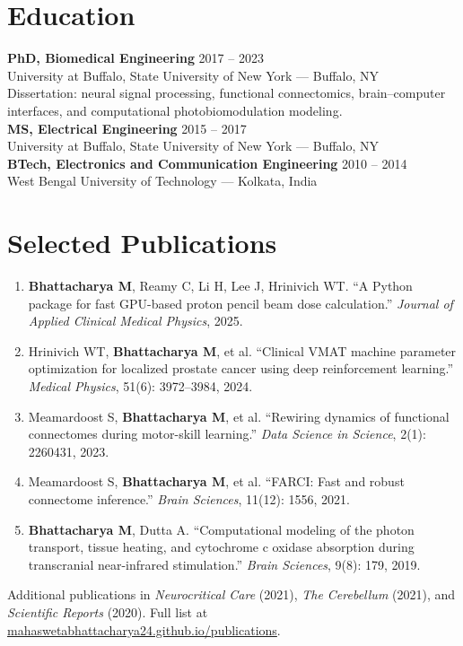 \documentclass[11pt,letterpaper]{article}
\begin{document}
\section*{Education}
\textbf{PhD, Biomedical Engineering} \hfill 2017 -- 2023\\
University at Buffalo, State University of New York --- Buffalo, NY\\
{\small Dissertation: neural signal processing, functional connectomics, brain--computer interfaces, and computational photobiomodulation modeling.}\\[3pt]
\textbf{MS, Electrical Engineering} \hfill 2015 -- 2017\\
University at Buffalo, State University of New York --- Buffalo, NY\\[3pt]
\textbf{BTech, Electronics and Communication Engineering} \hfill 2010 -- 2014\\
West Bengal University of Technology --- Kolkata, India

\section*{Selected Publications}
\begin{enumerate}[leftmargin=1.4em,itemsep=2pt,topsep=2pt]
  \item \textbf{Bhattacharya M}, Reamy C, Li H, Lee J, Hrinivich WT.
        ``A Python package for fast GPU-based proton pencil beam dose calculation.''
        \textit{Journal of Applied Clinical Medical Physics}, 2025.
  \item Hrinivich WT, \textbf{Bhattacharya M}, et al. ``Clinical VMAT machine parameter optimization
        for localized prostate cancer using deep reinforcement learning.''
        \textit{Medical Physics}, 51(6): 3972--3984, 2024.
  \item Meamardoost S, \textbf{Bhattacharya M}, et al. ``Rewiring dynamics of functional connectomes
        during motor-skill learning.'' \textit{Data Science in Science}, 2(1): 2260431, 2023.
  \item Meamardoost S, \textbf{Bhattacharya M}, et al. ``FARCI: Fast and robust connectome inference.''
        \textit{Brain Sciences}, 11(12): 1556, 2021.
  \item \textbf{Bhattacharya M}, Dutta A. ``Computational modeling of the photon transport, tissue
        heating, and cytochrome c oxidase absorption during transcranial near-infrared stimulation.''
        \textit{Brain Sciences}, 9(8): 179, 2019.
\end{enumerate}
{\small Additional publications in \textit{Neurocritical Care} (2021), \textit{The Cerebellum} (2021),
and \textit{Scientific Reports} (2020). Full list at
\href{https://mahaswetabhattacharya24.github.io/publications/}{mahaswetabhattacharya24.github.io/publications}.}
\end{document}
